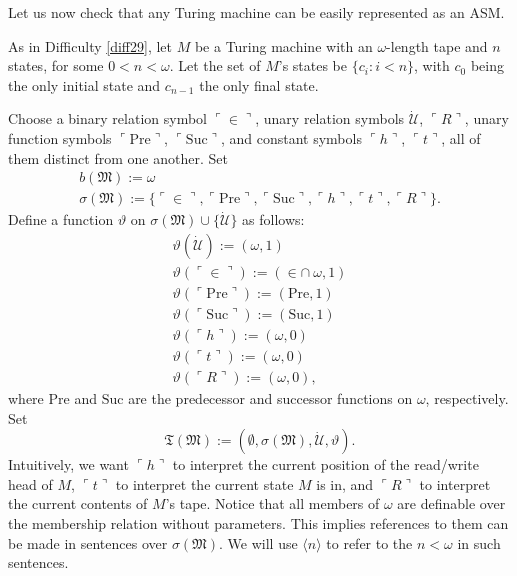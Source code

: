 \documentclass[12pt]{article}
\numberwithin{equation}{section}
\begin{document}
Let us now check that any Turing machine can be easily represented as an ASM.

\begin{ex}\label{ex212}
As in Difficulty \ref{diff29}, let $M$ be a Turing machine with an $\omega$-length tape and $n$ states, for some $0 < n < \omega$. Let the set of $M$'s states be $\{c_i : i < n\}$, with $c_0$ being the only initial state and $c_{n-1}$ the only final state. 

Choose a binary relation symbol $\ulcorner \in \urcorner$, unary relation symbols $\dot{\mathcal{U}}$, $\ulcorner R \urcorner$, unary function symbols $\ulcorner \mathrm{Pre} \urcorner$, $\ulcorner \mathrm{Suc} \urcorner$, and constant symbols $\ulcorner h \urcorner$, $\ulcorner t \urcorner$, all of them distinct from one another. Set 
\begin{gather*}
    b(\mathfrak{M}) := \omega \\
    \sigma(\mathfrak{M}) := \{\ulcorner \in \urcorner, \ulcorner \mathrm{Pre} \urcorner, \ulcorner \mathrm{Suc} \urcorner, \ulcorner h \urcorner, \ulcorner t \urcorner, \ulcorner R \urcorner\} \text{.}
\end{gather*}
Define a function $\vartheta$ on $\sigma(\mathfrak{M}) \cup \{\dot{\mathcal{U}}\}$ as follows:
\begin{gather*}
    \vartheta(\dot{\mathcal{U}}) := (\omega, 1) \\
    \vartheta(\ulcorner \in \urcorner) := (\in \cap \ \omega, 1) \\
    \vartheta(\ulcorner \mathrm{Pre} \urcorner) := (\mathrm{Pre}, 1) \\
    \vartheta(\ulcorner \mathrm{Suc} \urcorner) := (\mathrm{Suc}, 1) \\
    \vartheta(\ulcorner h \urcorner) := (\omega, 0) \\
    \vartheta(\ulcorner t \urcorner) := (\omega, 0) \\
    \vartheta(\ulcorner R \urcorner) := (\omega, 0) \text{,}
\end{gather*}
where $\mathrm{Pre}$ and $\mathrm{Suc}$ are the predecessor and successor functions on $\omega$, respectively. Set
\begin{equation*}
    \mathfrak{T}(\mathfrak{M}) := (\emptyset, \sigma(\mathfrak{M}), \dot{\mathcal{U}}, \vartheta) \text{.}
\end{equation*}
Intuitively, we want $\ulcorner h \urcorner$ to interpret the current position of the read/write head of $M$, $\ulcorner t \urcorner$ to interpret the current state $M$ is in, and $\ulcorner R \urcorner$ to interpret the current contents of $M$'s tape. Notice that all members of $\omega$ are definable over the membership  relation without parameters. This implies references to them can be made in sentences over $\sigma(\mathfrak{M})$. We will use $\langle n \rangle$ to refer to the $n < \omega$ in such sentences. 


\end{ex}
\end{document}

